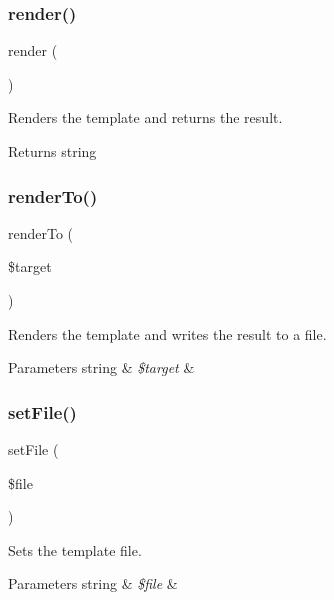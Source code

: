 \subsubsection{\texorpdfstring{render()}{render()}}
{\footnotesize\ttfamily render (\begin{DoxyParamCaption}{ }\end{DoxyParamCaption})}

Renders the template and returns the result.

\begin{DoxyReturn}{Returns}
string 
\end{DoxyReturn}
\mbox{\label{class_text___template_ab6a86d8a9247de41c28ea861372c3fb3}} 
\subsubsection{\texorpdfstring{render\+To()}{renderTo()}}
{\footnotesize\ttfamily render\+To (\begin{DoxyParamCaption}\item[{}]{\$target }\end{DoxyParamCaption})}

Renders the template and writes the result to a file.


\begin{DoxyParams}[1]{Parameters}
string & {\em \$target} & \\
\hline
\end{DoxyParams}
\mbox{\label{class_text___template_a786ea2bbab26bd4a0ecae24b253d17fe}} 
\subsubsection{\texorpdfstring{set\+File()}{setFile()}}
{\footnotesize\ttfamily set\+File (\begin{DoxyParamCaption}\item[{}]{\$file }\end{DoxyParamCaption})}

Sets the template file.


\begin{DoxyParams}[1]{Parameters}
string & {\em \$file} & \\
\hline
\end{DoxyParams}

